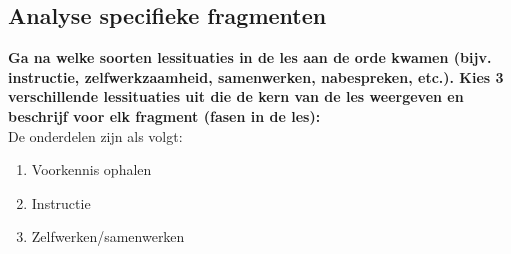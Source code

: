 \documentclass{article}
\begin{document}
        \subsection{Analyse specifieke fragmenten}
            \textbf{Ga na welke soorten lessituaties in de les aan de orde kwamen (bijv. instructie, zelfwerkzaamheid, samenwerken, nabespreken, etc.). Kies 3 verschillende lessituaties uit die de kern van de les weergeven en beschrijf voor elk fragment (fasen in de les): } \\
            De onderdelen zijn als volgt:
            \begin{enumerate}
                \item Voorkennis ophalen
                \item Instructie
                \item Zelfwerken/samenwerken
            \end{enumerate}
            \smallskip
\end{document}
